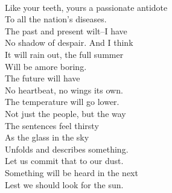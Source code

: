 \documentclass[smalldemyvopaper,11pt,twoside,onecolumn,openright,extrafontsizes]{memoir}
\begin{document}
\\Like your teeth, yours a passionate antidote
\\To all the nation's diseases.
\\The past and present wilt--I have
\\No shadow of despair. And I think
\\It will rain out, the full summer
\\Will be amore boring.
\\The future will have
\\No heartbeat, no wings its own.
\\The temperature will go lower.
\\Not just the people, but the way
\\The sentences feel thirsty
\\As the glass in the sky
\\Unfolds and describes something.
\\Let us commit that to our dust.
\\Something will be heard in the next
\\Lest we should look for the sun.
\end{document}
